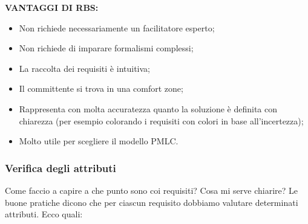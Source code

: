 \textbf{VANTAGGI DI RBS:}
\begin{itemize}
	\item Non richiede necessariamente un facilitatore esperto;
	\item Non richiede di imparare formalismi complessi;
	\item La raccolta dei requisiti è intuitiva;
	\item Il committente si trova in una comfort zone;
	\item Rappresenta con molta accuratezza quanto la soluzione è definita con chiarezza (per esempio colorando i requisiti con colori in base all'incertezza);
	\item Molto utile per scegliere il modello PMLC.
\end{itemize}
\subsubsection{Verifica degli attributi}
Come faccio a capire a che punto sono coi requisiti? Cosa mi serve chiarire? Le buone pratiche dicono che per ciascun requisito dobbiamo valutare determinati attributi. Ecco quali:
